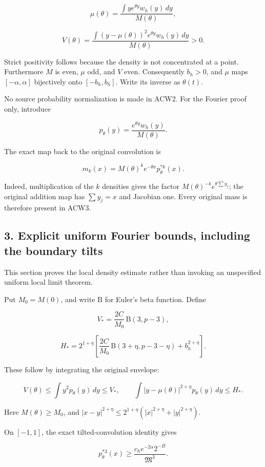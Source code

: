 \[
\mu(\theta)=\frac{\int y e^{\theta y}w_h(y)\,dy}{M(\theta)},
\]

\[
V(\theta)=\frac{\int (y-\mu(\theta))^2e^{\theta y}w_h(y)\,dy}{M(\theta)}>0.
\]

Strict positivity follows because the density is not concentrated at a point. Furthermore \(M\) is even, \(\mu\) odd, and \(V\) even. Consequently \(b_h>0\), and \(\mu\) maps \([-\alpha,\alpha]\) bijectively onto \([-b_h,b_h]\). Write its inverse as \(\theta(t)\).

No source probability normalization is made in ACW2. For the Fourier proof only, introduce

\[
p_\theta(y)=\frac{e^{\theta y}w_h(y)}{M(\theta)}.
\]

The exact map back to the original convolution is

\[
\boxed{m_k(x)=M(\theta)^k e^{-\theta x}p_\theta^{*k}(x).}
\tag{ACW3}
\]

Indeed, multiplication of the \(k\) densities gives the factor
\(M(\theta)^{-k}e^{\theta\sum y_j}\); the original addition map has \(\sum y_j=x\) and Jacobian one. Every original mass is therefore present in ACW3.

\subsection{3. Explicit uniform Fourier bounds, including the boundary tilts}\label{explicit-uniform-fourier-bounds-including-the-boundary-tilts}

This section proves the local density estimate rather than invoking an unspecified uniform local limit theorem.

Put \(M_0=M(0)\), and write \(\mathrm B\) for Euler's beta function. Define

\[
V_* = \frac{2C}{M_0}\,\mathrm B(3,p-3),
\]

\[
H_* = 2^{1+\eta}\left[
\frac{2C}{M_0}\,\mathrm B(3+\eta,p-3-\eta)
+b_h^{2+\eta}\right].
\tag{ACW4}
\]

These follow by integrating the original envelope:

\[
V(\theta)\le\int y^2p_\theta(y)\,dy\le V_*,
\qquad
\int|y-\mu(\theta)|^{2+\eta}p_\theta(y)\,dy\le H_*.
\]

Here \(M(\theta)\ge M_0\), and
\(|x-y|^{2+\eta}\le2^{1+\eta}(|x|^{2+\eta}+|y|^{2+\eta})\).

On \([-1,1]\), the exact tilted-convolution identity gives

\[
p_\theta^{*3}(x)\ge
\frac{c_h e^{-2\alpha}2^{-B}}{\mathfrak M^3}.
\]

